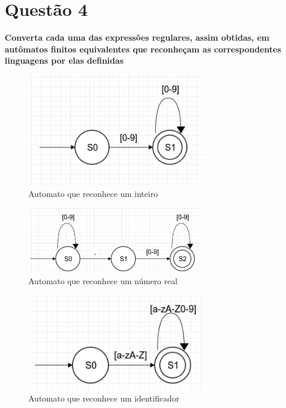 \section{Questão 4}
\textbf{Converta cada uma das expressões regulares, assim obtidas, em autômatos finitos equivalentes que reconheçam as correspondentes linguagens por elas definidas}

\begin{figure}[H]
  \caption{Automato que reconhece um inteiro}
  \centering
    \includegraphics[width=0.7\textwidth]{../0-lexico/automatos/integer}
\end{figure}

\begin{figure}[H]
  \caption{Automato que reconhece um número real}
  \centering
    \includegraphics[width=0.7\textwidth]{../0-lexico/automatos/float}
\end{figure}

\begin{figure}[H]
  \caption{Automato que reconhece um identificador}
  \centering
    \includegraphics[width=0.7\textwidth]{../0-lexico/automatos/keyword_identifier}
\end{figure}

